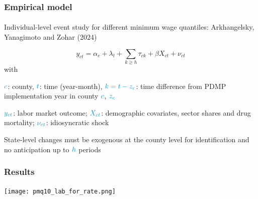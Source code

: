 
\begin{frame}

    \frametitle{Empirical model} %
    \framesubtitle{}  %
    \rmfamily %
    
    \begin{wideitemize}
        \item Individual-level event study for different minimum wage quantiles: \textcolor{fgre}{Arkhangelsky, Yanagimoto and Zohar (2024)}
    \end{wideitemize}
    
    \begin{equation*}
        y_{ct} = \alpha_c + \lambda_t + \sum_{k\geq h}\tau_{ck} + \beta X_{ct} + \nu_{ct}
    \end{equation*}
    with 
    \vspace{9pt}
    \begin{wideitemize}
        \item[\textcolor{fblu}{\textbullet}] \(\textcolor{fblu}{c}\): county, \(\textcolor{fblu}{t}\): time (year-month), \(\textcolor{fblu}{k = t - z_c}\): time difference from PDMP implementation year in county \(\textcolor{fblu}{c}\), \(\textcolor{fblu}{z_c}\)
        \item[\textcolor{fblu}{\textbullet}] \(\textcolor{fblu}{y_{ct}}\): labor market outcome; \(\textcolor{fblu}{X_{ct}}\): demographic covariates, sector shares and drug mortality; \(\textcolor{fblu}{\nu_{ct}}\): idiosyncratic shock 
    \end{wideitemize}
    \vspace{9pt}
    State-level changes must be exogenous at the county level for \textcolor{fblu}{identification} and no anticipation up to \(\textcolor{fblu}{h}\) periods
    
\end{frame}

\begin{frame}

    \label{lab_force_rate_result}
    \frametitle{Results} %
    \framesubtitle{}  %
    \rmfamily %
    
    \begin{center} %
        \texttt{[image: pmq10\_lab\_for\_rate.png]}
    \end{center}

    \hyperlink{perc_comparison_3}{}
    \hyperlink{ta_3}{}
    \hyperlink{presc_3}{}

\end{frame}

